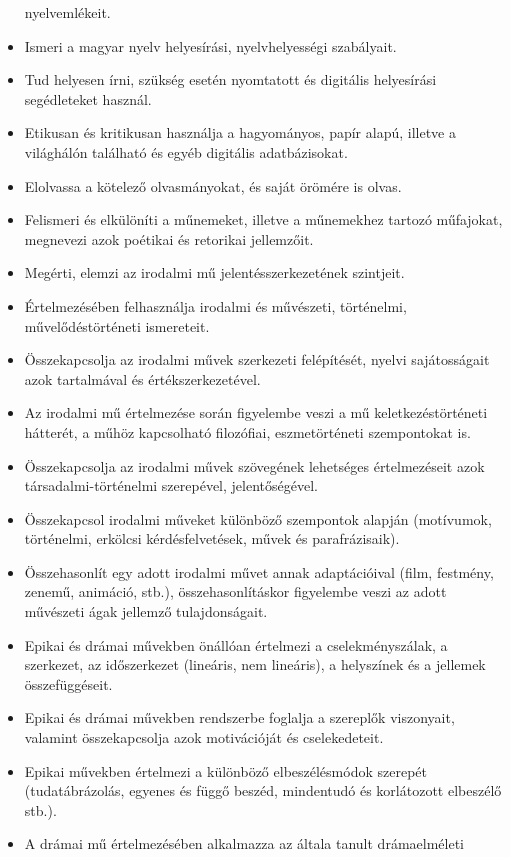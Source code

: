 \begin{itemize}
  nyelvemlékeit.
\item
  Ismeri a magyar nyelv helyesírási, nyelvhelyességi szabályait.
\item
  Tud helyesen írni, szükség esetén nyomtatott és digitális helyesírási
  segédleteket használ.
\item
  Etikusan és kritikusan használja a hagyományos, papír alapú, illetve a
  világhálón található és egyéb digitális adatbázisokat.
\item
  Elolvassa a kötelező olvasmányokat, és saját örömére is olvas.
\item
  Felismeri és elkülöníti a műnemeket, illetve a műnemekhez tartozó
  műfajokat, megnevezi azok poétikai és retorikai jellemzőit.
\item
  Megérti, elemzi az irodalmi mű jelentésszerkezetének szintjeit.
\item
  Értelmezésében felhasználja irodalmi és művészeti, történelmi,
  művelődéstörténeti ismereteit.
\item
  Összekapcsolja az irodalmi művek szerkezeti felépítését, nyelvi
  sajátosságait azok tartalmával és értékszerkezetével.
\item
  Az irodalmi mű értelmezése során figyelembe veszi a mű
  keletkezéstörténeti hátterét, a műhöz kapcsolható filozófiai,
  eszmetörténeti szempontokat is.
\item
  Összekapcsolja az irodalmi művek szövegének lehetséges értelmezéseit
  azok társadalmi-történelmi szerepével, jelentőségével.
\item
  Összekapcsol irodalmi műveket különböző szempontok alapján (motívumok,
  történelmi, erkölcsi kérdésfelvetések, művek és parafrázisaik).
\item
  Összehasonlít egy adott irodalmi művet annak adaptációival (film,
  festmény, zenemű, animáció, stb.), összehasonlításkor figyelembe veszi
  az adott művészeti ágak jellemző tulajdonságait.
\item
  Epikai és drámai művekben önállóan értelmezi a cselekményszálak, a
  szerkezet, az időszerkezet (lineáris, nem lineáris), a helyszínek és a
  jellemek összefüggéseit.
\item
  Epikai és drámai művekben rendszerbe foglalja a szereplők viszonyait,
  valamint összekapcsolja azok motivációját és cselekedeteit.
\item
  Epikai művekben értelmezi a különböző elbeszélésmódok szerepét
  (tudatábrázolás, egyenes és függő beszéd, mindentudó és korlátozott
  elbeszélő stb.).
\item
  A drámai mű értelmezésében alkalmazza az általa tanult drámaelméleti

\end{itemize}
